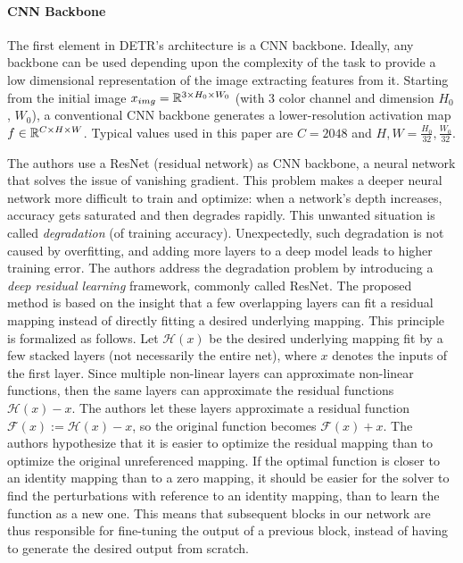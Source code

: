 \paragraph{CNN Backbone} The first element in DETR's architecture is a CNN backbone.  Ideally, any backbone can be used depending upon the complexity of the task to provide a low dimensional representation of the image extracting features from it. Starting from the initial image $x_{img} = \mathbb{R}^{3\times H_0\times W_0}$ (with 3 color channel and dimension $H_0$, $W_0$), a conventional CNN backbone generates a lower-resolution activation map $f \in \mathbb{R}^{C \times H \times W}$. Typical values used in this paper are $C = 2048$ and $H, W = \frac{H_0}{32}, \frac{W_0}{32}$. 

The authors use a ResNet (residual network) \cite{resnet} as CNN backbone, a neural network that solves the issue of vanishing gradient. This problem makes a deeper neural network more difficult to train and optimize: when a network's depth increases, accuracy gets saturated and then degrades rapidly. This unwanted situation is called \textit{degradation} (of training accuracy). Unexpectedly, such degradation is not caused by overfitting, and adding
more layers to a deep model leads to higher training error. The authors address the degradation problem by introducing a \textit{deep residual learning} framework, commonly called ResNet. The proposed method is based on the insight that a few overlapping layers can fit a residual mapping instead of directly fitting a desired underlying mapping. This principle is formalized as follows. Let $\mathcal{H}(x)$ be the desired underlying mapping fit by a few stacked layers (not necessarily the entire net), where $x$ denotes the inputs of the first layer. Since multiple non-linear layers can approximate non-linear functions, then  the same layers can approximate the residual functions $\mathcal{H}(x) - x$. The authors let these layers approximate a residual function
$\mathcal{F}(x) := \mathcal{H}(x) - x$, so the original function becomes
$\mathcal{F}(x)+x$. The authors hypothesize that it is easier to optimize the residual mapping than to optimize the original unreferenced mapping.  If the optimal function is closer to an identity
mapping than to a zero mapping, it should be easier for the
solver to find the perturbations with reference to an identity
mapping, than to learn the function as a new one. This means that subsequent blocks in our network are thus responsible for fine-tuning the output of a previous block, instead of having to generate the desired output from scratch.

